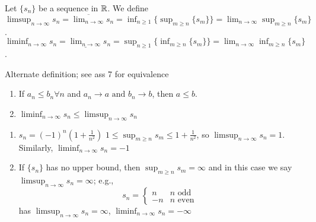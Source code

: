 \begin{definition}
	\label{def:3.16}
	Let $\{ {s}_{n}\}$ be a sequence in $\mathbb{R}$. We define $\limsup_{n\to \infty }{s_{n}}=\overline{\lim_{n\to \infty } }s_n=\inf_{n\ge 1}\{\sup_{m\ge n}\{s_m\}\}=\lim_{n\to \infty }{\sup_{m\ge n}\{s_m\}}$.\\
	$\liminf_{n\to \infty }{s_{n}}=\underline{\lim_{n\to \infty} }s_n=\sup_{n\ge 1}\{\inf_{m\ge n}\{s_m\}\}=\lim_{n\to \infty }{\inf_{m\ge n}\{s_m\}}$.
	\begin{note}
		Alternate definition; see ass 7 for equivalence
	\end{note}
	\begin{remark}
		\begin{enumerate}
			\item
			      If $a_{n}\le b_{n} \forall n$ and $a_{n}\to a \text{ and } b_{n}\to b$, then $a\le b$.
			\item $\liminf_{n\to \infty }s_n \le \limsup_{n\to \infty }s_{n}$
		\end{enumerate}
	\end{remark}
\end{definition}

\begin{example}
	\begin{enumerate}
		\item $s_{n}=(-1)^{n}(1+\frac{1}{n^2})$
		      $1\le \sup_{m\ge n}{s_{m}}\le 1+\frac{1}{n^2}$, so $\limsup_{n\to \infty }{s_{n}}=1$. Similarly, $\liminf_{n\to \infty }{s_{n}}=-1$
		\item If $\{ {s}_{n}\}$ has no upper bound, then $\sup_{m\ge n}{s_m}=\infty $ and in this case we say $\limsup_{n\to \infty}{s_{n}}=\infty $; e.g.,
		      \[
			      s_n=
			      \begin{cases}
				      n  & n\text{ odd }  \\
				      -n & n\text{ even }
			      \end{cases}
		      \]
		      has
		      $\limsup_{n\to \infty}{s_{n}}=\infty $,
		      $\liminf_{n\to \infty}{s_{n}}=-\infty $
	\end{enumerate}
\end{example}

